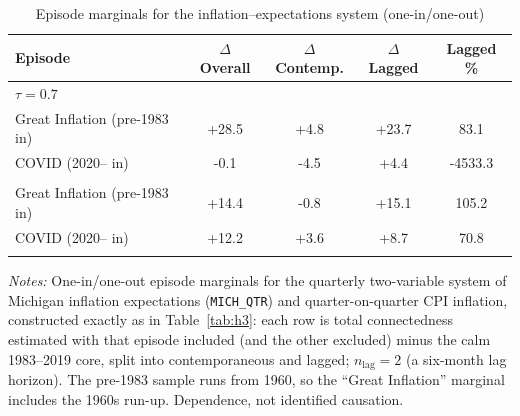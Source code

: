 \begin{table}[!ht]
\centering
\caption{Episode marginals for the inflation--expectations system (one-in/one-out)}
\label{tab:h6marginal}
\setlength{\tabcolsep}{6pt}\footnotesize
\begin{threeparttable}
\begin{tabular}{l c c c c}
\toprule
Episode & $\Delta$Overall & $\Delta$Contemp. & $\Delta$Lagged & Lagged \% \\
\midrule
\multicolumn{5}{l}{\textit{$\tau=0.7$}}\\
Great Inflation (pre-1983 in) & +28.5 & +4.8 & +23.7 & 83.1 \\
COVID (2020-- in) & -0.1 & -4.5 & +4.4 & -4533.3 \\
\addlinespace
\multicolumn{5}{l}{\textit{$\tau=0.9$}}\\
Great Inflation (pre-1983 in) & +14.4 & -0.8 & +15.1 & 105.2 \\
COVID (2020-- in) & +12.2 & +3.6 & +8.7 & 70.8 \\
\addlinespace
\bottomrule
\end{tabular}
\begin{tablenotes}[flushleft]\footnotesize
\item \textit{Notes:} One-in/one-out episode marginals for the quarterly two-variable system of Michigan inflation expectations (\texttt{MICH\_QTR}) and quarter-on-quarter CPI inflation, constructed exactly as in Table~\ref{tab:h3}: each row is total connectedness estimated with that episode included (and the other excluded) minus the calm 1983--2019 core, split into contemporaneous and lagged; $n_{\text{lag}}=2$ (a six-month lag horizon). The pre-1983 sample runs from 1960, so the ``Great Inflation'' marginal includes the 1960s run-up. Dependence, not identified causation.
\end{tablenotes}
\end{threeparttable}
\end{table}

